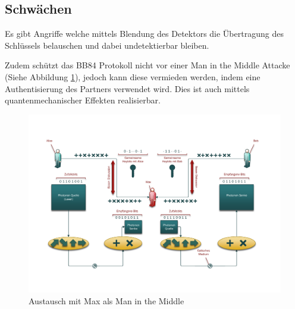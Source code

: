  \subsection{Schw\"achen}
  Es gibt Angriffe welche mittels Blendung des Detektors die \"Ubertragung des Schl\"ussels belauschen
  und dabei undetektierbar bleiben. \cite{qc:detector}

  Zudem sch\"utzt das BB84 Protokoll nicht vor einer Man in the Middle Attacke (Siehe Abbildung \ref{crypto:BB84Max}),
  jedoch kann diese vermieden werden, indem eine Authentisierung des Partners verwendet wird.
  Dies ist auch mittels quantenmechanischer Effekten realisierbar. \cite{qc:Authentisierung}

  \begin{figure}
    \centering
    \includegraphics[height=0.35\textheight]{crypto/BB84Max.pdf}
    \caption{Austausch mit Max als Man in the Middle\label{crypto:BB84Max}}
  \end{figure}
